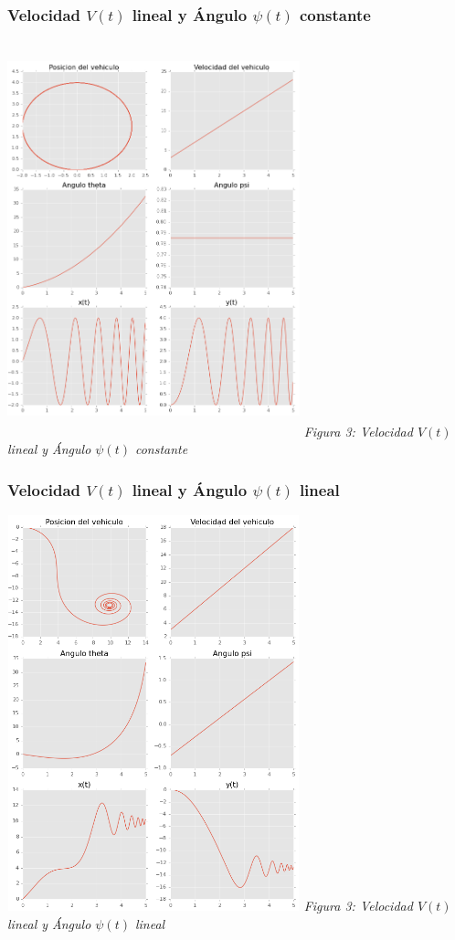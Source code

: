 \documentclass[twoside]{article}
\begin{document}
\begin{multicols}{2}
\subsubsection{Velocidad $V(t)$ lineal y Ángulo $\psi(t)$ constante}
\begin{center}
 \includegraphics[width=240pt,height=325pt]{./v_lin_psi_const.png}
  \textit{Figura 3: Velocidad $V(t)$ lineal y Ángulo $\psi(t)$ constante}
\end{center}

\subsubsection{Velocidad $V(t)$ lineal y Ángulo $\psi(t)$ lineal}
\begin{center}
 \includegraphics[width=240pt,height=325pt]{./v_lin_psi_lin.png}
  \textit{Figura 3: Velocidad $V(t)$ lineal y Ángulo $\psi(t)$ lineal}
\end{center}


\end{multicols}
\end{document}
